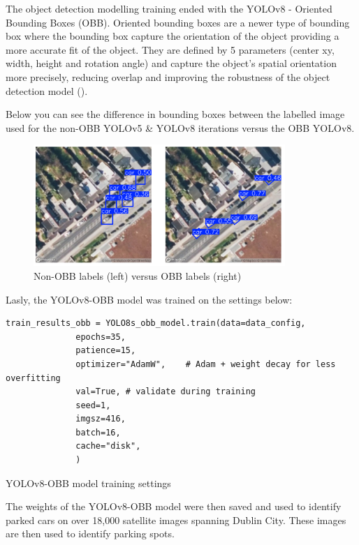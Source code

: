 The object detection modelling training ended with the YOLOv8 - Oriented
Bounding Boxes (OBB).
Oriented bounding boxes are a newer type of bounding box where the bounding box
capture the orientation of the object providing a more accurate fit of the
object. They are defined by 5 parameters (center xy, width, height and rotation
angle) and capture the object's spatial orientation more precisely, reducing
overlap and improving the robustness of the object detection model
(\cite{obblit}).

\newpage{}
Below you can see the difference in bounding boxes between the labelled image
used for the non-OBB YOLOv5 \& YOLOv8 iterations versus the OBB YOLOv8.

\begin{figure}[htbp]
  \centering
  \includegraphics[width=0.85\textwidth]{images/obb-vs-nonobb-img.png}
  \caption{Non-OBB labels (left) versus OBB labels (right)}
\end{figure}

Lasly, the YOLOv8-OBB model was trained on the settings below:

\begin{listing}[htbp]
  \centering
  \begin{verbatim}
train_results_obb = YOLO8s_obb_model.train(data=data_config,
              epochs=35,
              patience=15,
              optimizer="AdamW",    # Adam + weight decay for less overfitting
              val=True, # validate during training
              seed=1,
              imgsz=416,
              batch=16,
              cache="disk",
              )
  \end{verbatim}
  \caption{YOLOv8-OBB model training settings}
\end{listing}

The weights of the YOLOv8-OBB model were then saved and used to identify parked
cars on over 18,000 satellite images spanning Dublin City. These images are then
used to identify parking spots.

